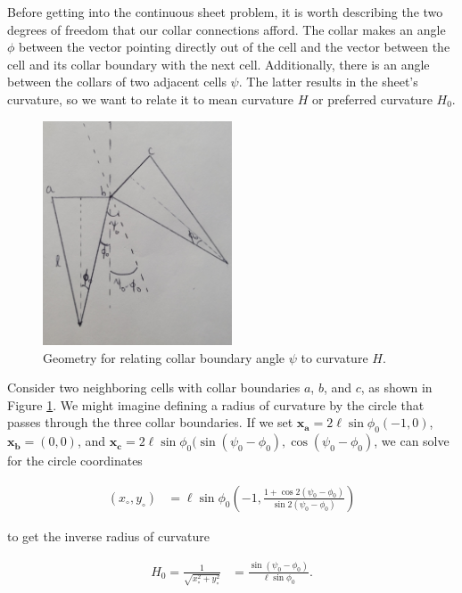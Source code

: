 Before getting into the continuous sheet problem, it is worth describing the two degrees of freedom that our collar connections afford. The collar makes an angle $\phi$ between the vector pointing directly out of the cell and the vector between the cell and its collar boundary with the next cell. Additionally, there is an angle between the collars of two adjacent cells $\psi$. The latter results in the sheet's curvature, so we want to relate it to mean curvature $H$ or preferred curvature $H_0$. 

\begin{figure}[htbp]
    \centering
    \includegraphics[width=0.5\textwidth]{hpsi.jpg}
    \caption{Geometry for relating collar boundary angle $\psi$ to curvature $H$. }
    \label{fig:hpsi}
\end{figure}

Consider two neighboring cells with collar boundaries $a$, $b$, and $c$, as shown in Figure \ref{fig:hpsi}. We might imagine defining a radius of curvature by the circle that passes through the three collar boundaries. If we set $\bm{x_a} = 2\ell\sin\phi_0(-1, 0)$, $\bm{x_b} = (0,0)$, and $\bm{x_c} = 2\ell\sin\phi_0 (\sin(\psi_0 - \phi_0), \cos(\psi_0-\phi_0)$, we can solve for the circle coordinates 

\begin{align*}
    (x_\circ, y_\circ) &= \ell \sin\phi_0\left(-1, \frac{1+\cos2(\psi_0 - \phi_0)}{\sin2(\psi_0 - \phi_0)} \right)
\end{align*}

\noindent to get the inverse radius of curvature 

\begin{align}
    H_0 = \frac{1}{\sqrt{x_\circ^2 + y_\circ^2}} &= \frac{\sin(\psi_0 - \phi_0)}{\ell \sin\phi_0}. 
\end{align}

